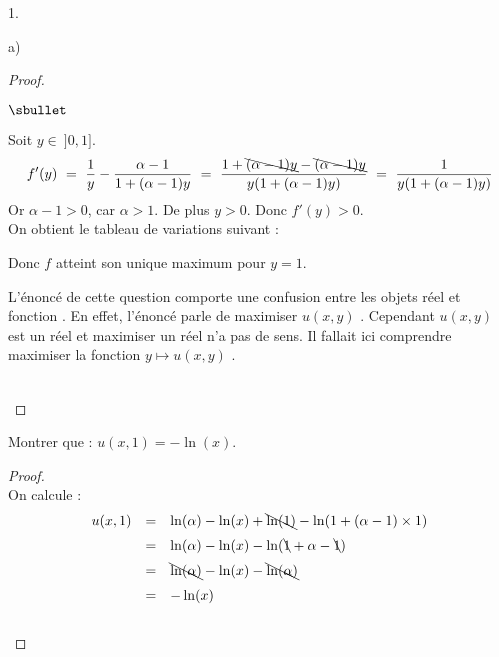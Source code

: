 \documentclass[11pt]{article}%
\begin{document}
\begin{noliste}{1.}
\begin{noliste}{a)}
\begin{proof}
\begin{noliste}{$\sbullet$}
	
	\item Soit $y \in \ ]0,1]$.
	\[
	  f'(y) \ = \ \dfrac{1}{y} - \dfrac{\alpha -1}{1+(\alpha-1)y}
	  \ = \ \dfrac{1+\bcancel{(\alpha-1)y} - \bcancel{(\alpha 
	  -1)y}}{y(1+(\alpha-1)y)} \ = \
	  \dfrac{1}{y (1+ (\alpha-1)y)}
	\]
	Or $\alpha-1 >0$, car $\alpha >1$. De plus $y>0$. Donc 
	$f'(y)>0$.\\
	On obtient le tableau de variations suivant :
	\begin{center}
      \end{center}
	Donc $f$ atteint son unique maximum pour $y=1$.
      \end{noliste}
      
      \begin{remarkL}{.98}
        L'énoncé de cette question  comporte  une confusion 
	entre les objets 
	\og réel \fg{} et \og fonction \fg{}.
	En effet, l'énoncé parle de \og maximiser $u(x,y)$ \fg{}.
	Cependant $u(x,y)$ est un réel et \og maximiser un réel \fg{}
	n'a pas de sens.
	Il fallait ici comprendre \og maximiser la fonction $y
	\mapsto u(x,y)$ \fg{}.
      \end{remarkL}~\\[-1.4cm]
    \end{proof}
    
    \item Montrer que : $u(x,1)=-\ln(x)$.
    
    \begin{proof}~\\
      On calcule :
      \[
        \begin{array}{rcl}
          u(x,1) &=& \ln(\alpha) - \ln(x) + \bcancel{\ln(1)} - 
          \ln(1+(\alpha -1) \times 1)
          \\[.2cm]
          &=& \ln(\alpha) - \ln(x) - \ln(\bcancel{1} + \alpha -
          \bcancel{1})
          \\[.2cm]
          &=& \bcancel{\ln(\alpha)} - \ln(x) - \bcancel{\ln(\alpha)}
          \\[.2cm]
          &=& - \ln(x)
        \end{array}
      \]
      ~\\[-1cm]
    \end{proof}
  \end{noliste}
  

\end{noliste}
\end{document}
